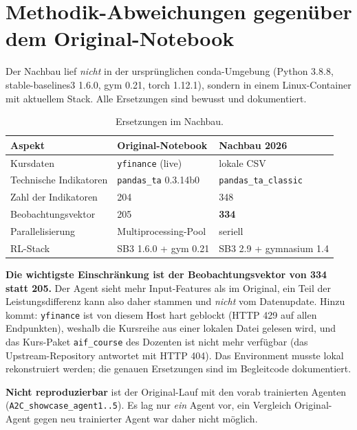 \section{Methodik-Abweichungen gegenüber dem Original-Notebook}
\label{sec:abweichungen}

Der Nachbau lief \emph{nicht} in der ursprünglichen conda-Umgebung (Python 3.8.8,
stable-baselines3 1.6.0, gym 0.21, torch 1.12.1), sondern in einem Linux-Container mit
aktuellem Stack. Alle Ersetzungen sind bewusst und dokumentiert.

\begin{table}[H]
  \centering
  \caption{Ersetzungen im Nachbau.}
  \label{tab:abweichungen}
  \begin{tabular}{lll}
    \toprule
    Aspekt & Original-Notebook & Nachbau 2026\\
    \midrule
    Kursdaten            & \texttt{yfinance} (live)      & lokale CSV\\
    Technische Indikatoren & \texttt{pandas\_ta} 0.3.14b0 & \texttt{pandas\_ta\_classic}\\
    Zahl der Indikatoren & 204                          & 348\\
    Beobachtungsvektor   & 205                          & \textbf{334}\\
    Parallelisierung     & Multiprocessing-Pool         & seriell\\
    RL-Stack             & SB3 1.6.0 + gym 0.21         & SB3 2.9 + gymnasium 1.4\\
    \bottomrule
  \end{tabular}
\end{table}

\textbf{Die wichtigste Einschränkung ist der Beobachtungsvektor von 334 statt 205.} Der Agent
sieht mehr Input-Features als im Original, ein Teil der Leistungsdifferenz kann also daher
stammen und \emph{nicht} vom Datenupdate. Hinzu kommt: \texttt{yfinance} ist von diesem Host
hart geblockt (HTTP 429 auf allen Endpunkten), weshalb die Kursreihe aus einer lokalen Datei
gelesen wird, und das Kurs-Paket \texttt{aif\_course} des Dozenten ist nicht mehr verfügbar
(das Upstream-Repository antwortet mit HTTP 404). Das Environment musste lokal
rekonstruiert werden; die genauen Ersetzungen sind im Begleitcode dokumentiert.

\textbf{Nicht reproduzierbar} ist der Original-Lauf mit den vorab trainierten Agenten
(\texttt{A2C\_showcase\_agent1..5}). Es lag nur \emph{ein} Agent vor, ein Vergleich
\glqq Original-Agent gegen neu trainierter Agent\grqq{} war daher nicht möglich.

